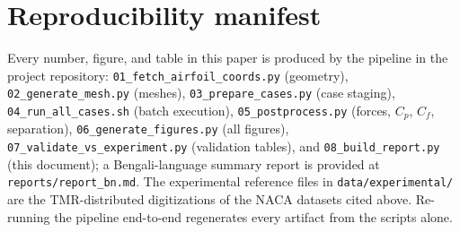 \documentclass[11pt,a4paper]{article}
\begin{document}
\section{Reproducibility manifest}\label{app:repro}
\enlargethispage{2\baselineskip}
Every number, figure, and table in this paper is produced by the pipeline in the project repository:
\texttt{01\_fetch\_airfoil\_coords.py} (geometry), \texttt{02\_generate\_mesh.py} (meshes),
\texttt{03\_prepare\_cases.py} (case staging), \texttt{04\_run\_all\_cases.sh} (batch execution),
\texttt{05\_postprocess.py} (forces, $C_p$, $C_f$, separation), \texttt{06\_generate\_figures.py}
(all figures), \texttt{07\_validate\_vs\_experiment.py} (validation tables), and
\texttt{08\_build\_report.py} (this document); a Bengali-language summary report is provided at \texttt{reports/report\_bn.md}. The experimental reference files in
\texttt{data/experimental/} are the TMR-distributed digitizations of the NACA datasets cited above.
Re-running the pipeline end-to-end regenerates every artifact from the scripts alone.
\end{document}
